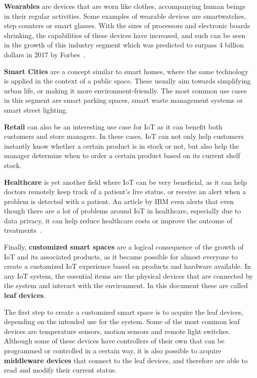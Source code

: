 \documentclass[runningheads]{llncs}
\begin{document}
\textbf{Wearables} are devices that are worn like clothes, accompanying human beings in their regular activities. Some examples of wearable devices are smartwatches, step counters or smart glasses. With the sizes of processors and electronic boards shrinking, the capabilities of these devices have increased, and such can be seen in the growth of this industry segment which was predicted to surpass 4 billion dollars in 2017 by Forbes~\cite{Marr2016}.

\textbf{Smart Cities} are a concept similar to smart homes, where the same technology is applied in the context of a public space. These usually aim towards simplifying urban life, or making it more environment-friendly. The most common use cases in this segment are smart parking spaces, smart waste management systems or smart street lighting.

\textbf{Retail} can also be an interesting use case for IoT as it can benefit both customers and store managers. In these cases, IoT can not only help customers instantly know whether a certain product is in stock or not, but also help the manager determine when to order a certain product based on its current shelf stock.

\textbf{Healthcare} is yet another field where IoT can be very beneficial, as it can help doctors remotely keep track of a patient’s live status, or receive an alert when a problem is detected with a patient. An article by IBM even alerts that even though there are a lot of problems around IoT in healthcare, especially due to data privacy, it can help reduce healthcare costs or improve the outcome of treatments~\cite{Patel2017}.

Finally, \textbf{customized smart spaces} are a logical consequence of the growth of IoT and its associated products, as it became possible for almost everyone to create a customized IoT experience based on products and hardware available. In any IoT system, the essential items are the physical devices that are connected by the system and interact with the environment. In this document these are called \textbf{leaf devices}. 

The first step to create a customized smart space is to acquire the leaf devices, depending on the intended use for the system. Some of the most common leaf devices are temperature sensors, motion sensors and remote light switches. Although some of these devices have controllers of their own that can be programmed or controlled in a certain way, it is also possible to acquire \textbf{middleware devices} that connect to the leaf devices, and therefore are able to read and modify their current status. 
\end{document}
